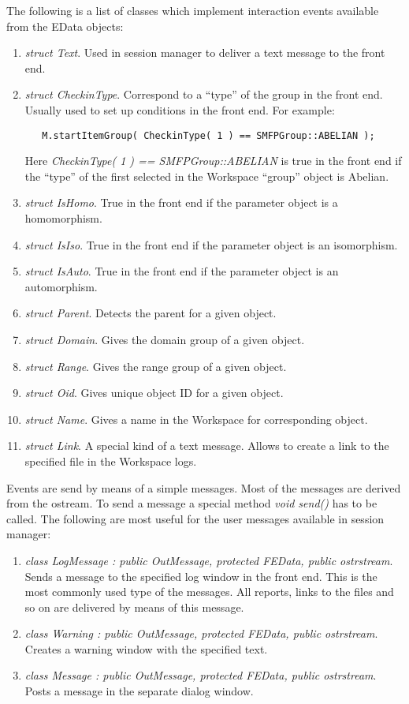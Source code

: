 \documentclass[12pt]{article}
\begin{document}
  The following is a list  of classes which implement interaction events
  available from the EData objects:
  \begin{enumerate}
  \item  \emph{struct Text}. Used in session manager to deliver a text message
  to the front end.
  \item \emph{ struct CheckinType}. Correspond to a ``type'' of the group in the 
  front end.
  Usually used to set up conditions in the front end. For example:
  \footnotesize
  \begin{verbatim}
   M.startItemGroup( CheckinType( 1 ) == SMFPGroup::ABELIAN );
  \end{verbatim}
  \normalsize
  Here \emph{  CheckinType( 1 ) == SMFPGroup::ABELIAN} is true in the front end if 
  the
  ``type'' of the first selected in the Workspace ``group'' object is Abelian.
  \item \emph{ struct IsHomo}. True in the front end if the  parameter object is a 
  homomorphism.
  \item \emph{ struct IsIso}. True in the front end if the  parameter object is an
  isomorphism.
  \item \emph{ struct IsAuto}. True in the front end if the  parameter object is 
  an
  automorphism.
  \item \emph{ struct Parent}. Detects the parent for a given object.
  \item \emph{ struct Domain}. Gives the domain group of a given object.
  \item \emph{struct Range}. Gives the range group of a given object.
  \item \emph{struct Oid}. Gives  unique object ID for a given object.
  \item \emph{ struct Name}. Gives a name in the Workspace for corresponding 
  object.
  \item \emph{struct Link}. A special kind of a text message. Allows to create a
  link to the specified file in  the Workspace logs.
  \end{enumerate}

  Events are send by means of a simple messages. Most of the messages are derived
  from the ostream. To send a message a special method \emph{void send()} has to
  be called.  The following are most useful for the user messages available
  in session manager:
  \begin{enumerate}
  \item \emph{class LogMessage : public OutMessage, protected FEData, public 
  ostrstream}.
  Sends a message to the specified log window in the front end.
  This is the most commonly used type of the messages. All reports, links to the 
  files
  and so on are delivered by means of this message.
  \item \emph{class Warning : public OutMessage, protected FEData, public 
  ostrstream}.
  Creates a warning window with the specified text.

  \item \emph{class Message : public OutMessage, protected FEData, public 
  ostrstream}. Posts
  a message in the separate dialog window.
  \end{enumerate}
\end{document}
